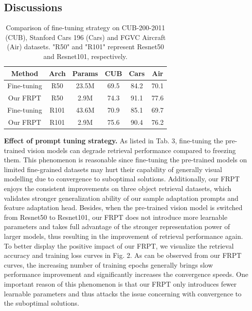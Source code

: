 \documentclass[letterpaper]{article} %
\begin{document}
\subsection{Discussions}



\begin{table}\centering

\begin{tabular}{c|c|c||c|c|c}
\hline
\hline
Method & Arch & Params & CUB & Cars & Air \\


\hline
\hline
Fine-tuning & R50 & 23.5M & 69.5 & 84.2 & 70.1 \\
Our FRPT  & R50 & 2.9M &74.3 & 91.1& 77.6\\
Fine-tuning & R101 & 43.6M & 70.9 & 85.1 & 69.7 \\
Our FRPT  & R101 & 2.9M &75.6 & 90.4& 76.2\\
\hline
\hline

\end{tabular}
\caption{ Comparison of fine-tuning strategy on CUB-200-2011 (CUB),  Stanford Cars 196 (Cars) and FGVC Aircraft (Air) datasets.  "R50" and "R101" represent Resnet50 and Resnet101\cite{He2015Deep}, respectively. %
}
\end{table}







\textbf{Effect of prompt tuning strategy.} As listed in Tab. 3, fine-tuning the pre-trained vision models can degrade retrieval performance compared to freezing them. This phenomenon is reasonable since fine-tuning the pre-trained models on limited fine-grained datasets may hurt their capability of generally visual modelling due to convergence to suboptimal solutions.
Additionally, our FRPT enjoys the consistent improvements on three object retrieval datasets, which validates stronger generalization ability of our sample adaptation prompts and feature adaptation head. Besides, when the pre-trained vision model is switched from Resnet50 to Resnet101, our FRPT does not introduce more learnable parameters and takes full advantage of the stronger representation power of larger models, thus resulting in the improvement of retrieval performance again.
To better display the positive impact of our FRPT, we visualize the retrieval accuracy and training loss curves in Fig. 2. As can be observed from our FRPT curves, the increasing number of training epochs generally brings slow performance improvement and significantly increases the convergence speeds. One important reason of this phenomenon is that our FRPT only introduces fewer learnable parameters and thus attacks the issue concerning with convergence to the suboptimal solutions.
\end{document}

